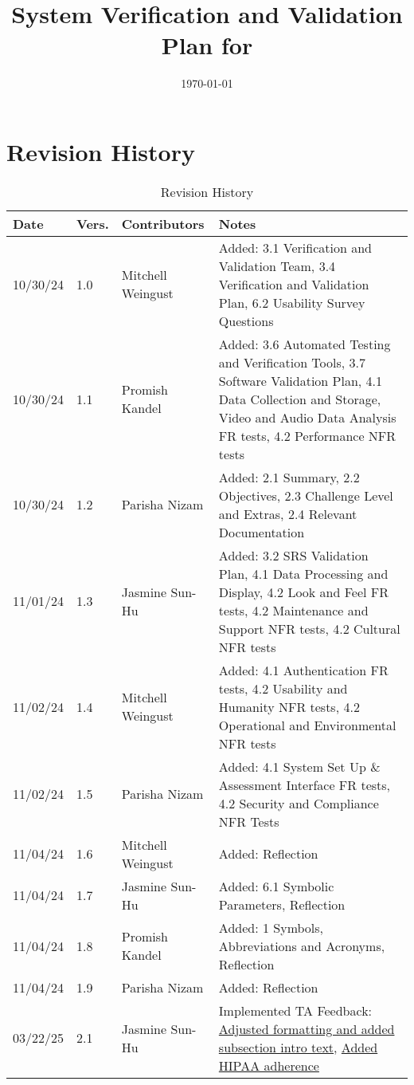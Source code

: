 \documentclass[12pt, titlepage]{article}
\begin{document}
\title{System Verification and Validation Plan for \progname{}} 
\author{\authname}
\date{\today}
	
\maketitle


\section*{Revision History}

\begin{table}[hp]
  \caption{Revision History} \label{TblRevisionHistory}
  \begin{tabularx}{\textwidth}{p{1.5cm}p{1cm}p{3.5cm}X}
  \toprule {\textbf{Date}} & {\textbf{Vers.}} & {\textbf{Contributors}} & {\textbf{Notes}}\\
  \midrule
  10/30/24 & 1.0 & Mitchell Weingust & Added: 3.1 Verification and Validation Team, 3.4 Verification and Validation Plan, 6.2 Usability Survey Questions \\
  10/30/24 & 1.1 & Promish Kandel & Added: 3.6 Automated Testing and Verification Tools, 3.7 Software Validation Plan, 4.1 Data Collection and Storage, Video and Audio Data Analysis FR tests, 4.2 Performance NFR tests \\
  10/30/24 & 1.2 & Parisha Nizam & Added: 2.1 Summary, 2.2 Objectives, 2.3 Challenge Level and Extras, 2.4 Relevant Documentation \\
  11/01/24 & 1.3 & Jasmine Sun-Hu & Added: 3.2 SRS Validation Plan, 4.1 Data Processing and Display, 4.2 Look and Feel FR tests, 4.2 Maintenance and Support NFR tests, 4.2 Cultural NFR tests \\
  11/02/24 & 1.4 & Mitchell Weingust & Added: 4.1 Authentication FR tests, 4.2 Usability and Humanity NFR tests, 4.2 Operational and Environmental NFR tests \\
  11/02/24 & 1.5 & Parisha Nizam & Added: 4.1 System Set Up \& Assessment Interface FR tests, 4.2 Security and Compliance NFR Tests \\
  11/04/24 & 1.6 & Mitchell Weingust & Added: Reflection \\
  11/04/24 & 1.7 & Jasmine Sun-Hu & Added: 6.1 Symbolic Parameters, Reflection \\
  11/04/24 & 1.8 & Promish Kandel & Added: 1 Symbols, Abbreviations and Acronyms, Reflection \\
  11/04/24 & 1.9 & Parisha Nizam & Added: Reflection \\
  03/22/25 & 2.1 & Jasmine Sun-Hu & Implemented TA Feedback: \href{https://github.com/parishanizam/TeleHealth/issues/292}{Adjusted formatting and added subsection intro text}, \href{https://github.com/parishanizam/TeleHealth/issues/293}{Added HIPAA adherence}\\
  \bottomrule
  \end{tabularx}
\end{table}
\end{document}
